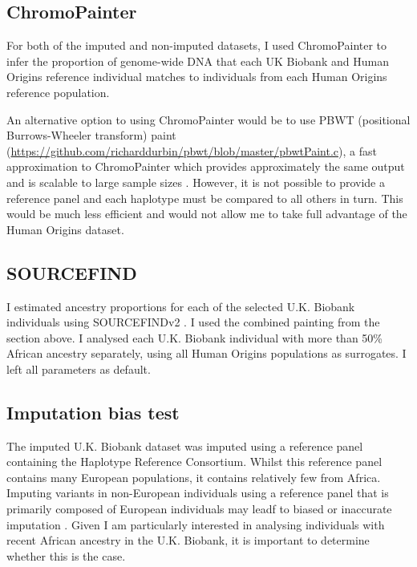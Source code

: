 \subsection{ChromoPainter}

For both of the imputed and non-imputed datasets, I used ChromoPainter to infer the proportion of genome-wide DNA that each UK Biobank and Human Origins reference individual matches to individuals from each Human Origins reference population. 

An alternative option to using ChromoPainter would be to use PBWT (positional Burrows-Wheeler transform) paint (\url{https://github.com/richarddurbin/pbwt/blob/master/pbwtPaint.c}), a fast approximation to ChromoPainter which provides approximately the same output and is scalable to large sample sizes \cite{byrne2020dutch}. However, it is not possible to provide a reference panel and each haplotype must be compared to all others in turn. This would be much less efficient and would not allow me to take full advantage of the Human Origins dataset. 

\subsection{SOURCEFIND}

I estimated ancestry proportions for each of the selected U.K. Biobank individuals using SOURCEFINDv2 \cite{Chacon-Duque2018}. I used the combined painting from the section above. I analysed each U.K. Biobank individual with more than 50\% African ancestry separately, using all Human Origins populations as surrogates. I left all parameters as default. 

\subsection{Imputation bias test} \label{sec:ImputationBiasTest}

The imputed U.K. Biobank dataset was imputed using a reference panel containing the Haplotype Reference Consortium. Whilst this reference panel contains many European populations, it contains relatively few from Africa. Imputing variants in non-European individuals using a reference panel that is primarily composed of European individuals may leadf to biased or inaccurate imputation \cite{huang2011haplotype}. Given I am particularly interested in analysing individuals with recent African ancestry in the U.K. Biobank, it is important to determine whether this is the case.  

